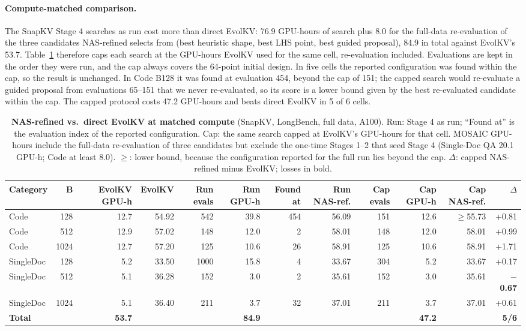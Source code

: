 \paragraph{Compute-matched comparison.} The SnapKV Stage 4 searches as run cost more than direct EvolKV: 76.9 GPU-hours of search plus 8.0 for the full-data re-evaluation of the three candidates NAS-refined selects from (best heuristic shape, best LHS point, best guided proposal), 84.9 in total against EvolKV's 53.7. Table~\ref{tab:app-capped} therefore caps each search at the GPU-hours EvolKV used for the same cell, re-evaluation included. Evaluations are kept in the order they were run, and the cap always covers the 64-point initial design. In five cells the reported configuration was found within the cap, so the result is unchanged. In Code B128 it was found at evaluation 454, beyond the cap of 151; the capped search would re-evaluate a guided proposal from evaluations 65--151 that we never re-evaluated, so its score is a lower bound given by the best re-evaluated candidate within the cap. The capped protocol costs 47.2 GPU-hours and beats direct EvolKV in 5 of 6 cells.

\begin{table}[t]
  \centering
  \scriptsize
  \setlength{\tabcolsep}{3pt}
  \begin{tabular}{@{}l r r r r r r r r r r r@{}}
    \toprule
    Category & B & EvolKV GPU-h & EvolKV & Run evals & Run GPU-h & Found at & Run NAS-ref. & Cap evals & Cap GPU-h & Cap NAS-ref. & $\Delta$ \\
    \midrule
    Code & 128 & 12.7 & 54.92 & 542 & 39.8 & 454 & 56.09 & 151 & 12.6 & $\geq$55.73 & +0.81 \\
    Code & 512 & 12.9 & 57.02 & 148 & 12.0 & 2 & 58.01 & 148 & 12.0 & 58.01 & +0.99 \\
    Code & 1024 & 12.7 & 57.20 & 125 & 10.6 & 26 & 58.91 & 125 & 10.6 & 58.91 & +1.71 \\
    SingleDoc & 128 & 5.2 & 33.50 & 1000 & 15.8 & 4 & 33.67 & 304 & 5.2 & 33.67 & +0.17 \\
    SingleDoc & 512 & 5.1 & 36.28 & 152 & 3.0 & 2 & 35.61 & 152 & 3.0 & 35.61 & \textbf{$-$0.67} \\
    SingleDoc & 1024 & 5.1 & 36.40 & 211 & 3.7 & 32 & 37.01 & 211 & 3.7 & 37.01 & +0.61 \\
    \textbf{Total} &  & \textbf{53.7} &  &  & \textbf{84.9} &  &  &  & \textbf{47.2} &  & \textbf{5/6} \\
    \bottomrule
  \end{tabular}
  \caption{\textbf{NAS-refined vs.\ direct EvolKV at matched compute} (SnapKV, LongBench, full data, A100). Run: Stage 4 as run; ``Found at'' is the evaluation index of the reported configuration. Cap: the same search capped at EvolKV's GPU-hours for that cell. MOSAIC GPU-hours include the full-data re-evaluation of three candidates but exclude the one-time Stages 1--2 that seed Stage 4 (Single-Doc QA 20.1 GPU-h; Code at least 8.0). $\geq$: lower bound, because the configuration reported for the full run lies beyond the cap. $\Delta$: capped NAS-refined minus EvolKV; losses in bold.}
  \label{tab:app-capped}
\end{table}

